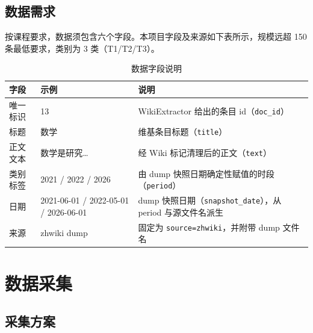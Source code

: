 \documentclass[12pt,a4paper]{article}
\begin{document}
\subsection{数据需求}

按课程要求，数据须包含六个字段。本项目字段及来源如下表所示，规模远超 150 条最低要求，类别为 3 类（T1/T2/T3）。

\begin{table}[H]
\centering
\caption{数据字段说明}
\renewcommand{\arraystretch}{1.3}
\begin{tabularx}{\textwidth}{|l|l|X|}
\hline
\textbf{字段} & \textbf{示例} & \textbf{说明} \\
\hline
唯一标识 & 13 & WikiExtractor 给出的条目 id（\texttt{doc\_id}） \\
\hline
标题 & 数学 & 维基条目标题（\texttt{title}） \\
\hline
正文文本 & 数学是研究… & 经 Wiki 标记清理后的正文（\texttt{text}） \\
\hline
类别标签 & 2021 / 2022 / 2026 & 由 dump 快照日期确定性赋值的时段（\texttt{period}） \\
\hline
日期 & 2021-06-01 / 2022-05-01 / 2026-06-01 & dump 快照日期（\texttt{snapshot\_date}），从 period 与源文件名派生 \\
\hline
来源 & zhwiki dump & 固定为 \texttt{source=zhwiki}，并附带 dump 文件名 \\
\hline
\end{tabularx}
\end{table}

\section{数据采集}

\subsection{采集方案}
\end{document}

